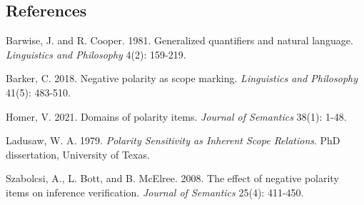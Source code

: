 \documentclass[
  11pt,
  a4paper,
]{article}
\begin{document}
\subsection{References}\label{references}

Barwise, J. and R. Cooper. 1981. Generalized quantifiers and natural
language. \emph{Linguistics and Philosophy} 4(2): 159-219.

Barker, C. 2018. Negative polarity as scope marking. \emph{Linguistics
and Philosophy} 41(5): 483-510.

Homer, V. 2021. Domains of polarity items. \emph{Journal of Semantics}
38(1): 1-48.

Ladusaw, W. A. 1979. \emph{Polarity Sensitivity as Inherent Scope
Relations}. PhD dissertation, University of Texas.

Szabolcsi, A., L. Bott, and B. McElree. 2008. The effect of negative
polarity items on inference verification. \emph{Journal of Semantics}
25(4): 411-450.
\end{document}
